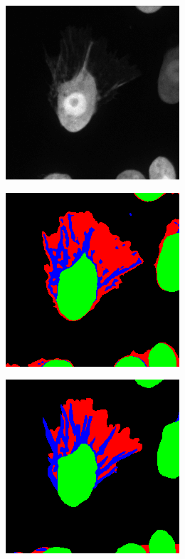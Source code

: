 \begin {figure}[!htb]
\begin {subfigure}[b]{0.25\linewidth}
	\end {subfigure}
	\par\medskip
	\begin {subfigure}[b]{0.25\linewidth}
		\includegraphics[scale=0.45]{img/fig_quali_tile4.png}
	\end {subfigure}\hspace{0.5cm}
	\begin {subfigure}[b]{0.25\linewidth}
		\includegraphics[scale=0.45]{img/fig_quali_tile4_pred_c4.png}
	\end {subfigure}\hspace{0.5cm}
	\begin {subfigure}[b]{0.25\linewidth}
		\includegraphics[scale=0.45]{img/fig_quali_tile4_pred_c4_GT.png}
	\end {subfigure}


\end{figure}
